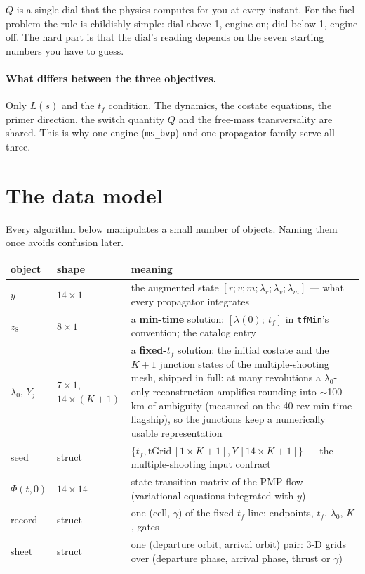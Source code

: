 \documentclass[11pt]{article}
\newcommand{\lv}{\lambda_v}\newcommand{\lr}{\lambda_r}\newcommand{\lm}{\lambda_m}
\newcommand{\tf}{t_f}\newcommand{\R}{\mathbb{R}}
\newcommand{\file}[1]{\texttt{#1}}
\begin{document}
\begin{eli}
$Q$ is a single dial that the physics computes for you at every instant.
For the fuel problem the rule is childishly simple: dial above 1, engine on;
dial below 1, engine off. The hard part is that the dial's reading depends on
the seven starting numbers you have to guess.
\end{eli}

\paragraph{What differs between the three objectives.} Only $L(s)$ and the
$\tf$ condition. The dynamics, the costate equations, the primer direction, the
switch quantity $Q$ and the free-mass transversality are shared. This is why one
engine (\file{ms\_bvp}) and one propagator family serve all three.

\section{The data model}
Every algorithm below manipulates a small number of objects. Naming them once
avoids confusion later.

\begin{center}\small
\begin{tabular}{@{}llp{}@{}}
\toprule
object & shape & meaning \\
\midrule
$y$ & $14\times1$ & the augmented state $[r;v;m;\lr;\lv;\lm]$ --- what every propagator integrates \\
$z_8$ & $8\times1$ & a \textbf{min-time} solution: $[\lambda(0);\ \tf]$ in \file{tfMin}'s convention; the catalog entry \\
$\lambda_0$, $Y_j$ & $7\times1$, $14\times(K{+}1)$ & a \textbf{fixed-$\tf$} solution: the initial costate and the $K{+}1$ junction states of the multiple-shooting mesh, shipped in full: at many revolutions a $\lambda_0$-only reconstruction amplifies rounding into $\sim$100 km of ambiguity (measured on the 40-rev min-time flagship), so the junctions keep a numerically usable representation \\
seed & struct & $\{\tf, \mathrm{tGrid}\,[1{\times}K{+}1], Y\,[14{\times}K{+}1]\}$ --- the multiple-shooting input contract \\
$\Phi(t,0)$ & $14\times14$ & state transition matrix of the PMP flow (variational equations integrated with $y$) \\
record & struct & one (cell, $\gamma$) of the fixed-$\tf$ line: endpoints, $\tf$, $\lambda_0$, $K$, gates \\
sheet & struct & one (departure orbit, arrival orbit) pair: 3-D grids over (departure phase, arrival phase, thrust or $\gamma$) \\
\bottomrule
\end{tabular}
\end{center}
\end{document}
